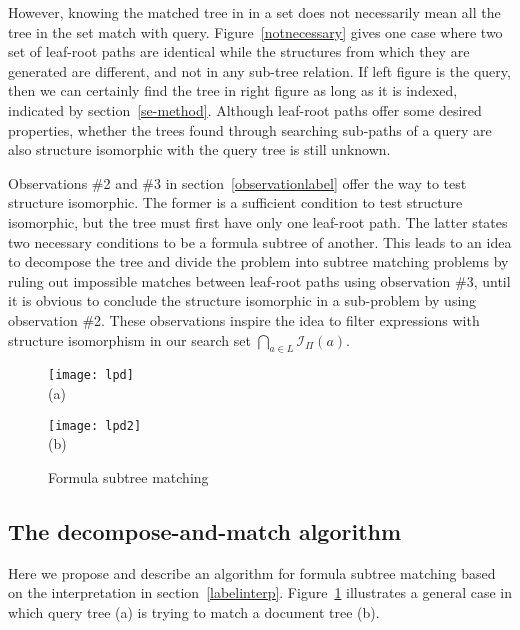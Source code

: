 However, knowing the matched tree in in a set does not necessarily mean all the tree in the set match with query. 
Figure~\ref{notnecessary} gives one case where two set of leaf-root paths are identical while the structures from which they are generated are different, and not in any sub-tree relation. If left figure is the query, then we can certainly find the tree in right figure as long as it is indexed, indicated by section~\ref{se-method}.
Although leaf-root paths offer some desired properties, whether the trees found through searching sub-paths of a query are also structure isomorphic with the query tree is still unknown. 

Observations \#2 and \#3 in section~\ref{observationlabel} offer the way to test structure isomorphic.
The former is a sufficient condition to test structure isomorphic, but the tree must first have only one leaf-root path. The latter states two necessary conditions to be a formula subtree of another.
This leads to an idea to decompose the tree and divide the problem into subtree matching problems by ruling out impossible matches between leaf-root paths using observation \#3, until it is obvious to conclude the structure isomorphic in a sub-problem by using observation \#2.
These observations inspire the idea to filter expressions with structure isomorphism in our search set $\bigcap_{a \in L} \mathcal{I}_{\Pi}(a)$.

\begin{figure}
\begin{minipage}[b]{2.65in}
\begin{center}
\texttt{[image: lpd]}
\\ (a)
\end{center}
\end{minipage}
\hspace*{.38in}
\begin{minipage}[b]{2.65in}
\begin{center}
{\texttt{[image: lpd2]}}
\\ (b) 
\end{center}
\end{minipage}
\caption{Formula subtree matching}\label{submatch}
\end{figure}

\subsection{The decompose-and-match algorithm}
Here we propose and describe an algorithm for formula subtree matching based on the interpretation in section~\ref{labelinterp}.
Figure~\ref{submatch} illustrates a general case in which query tree (a) is trying to match a document tree (b).

